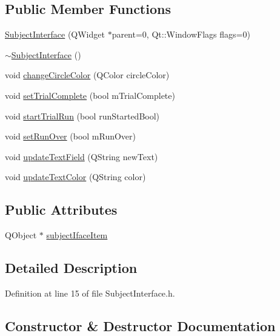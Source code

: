 \subsection*{Public Member Functions}
\begin{DoxyCompactItemize}
\item 
\hyperlink{class_subject_interface_aad1ec3eaf1a7a559e934631617f53ed2}{Subject\+Interface} (Q\+Widget $\ast$parent=0, Qt\+::\+Window\+Flags flags=0)
\item 
\hyperlink{class_subject_interface_ae3a3243c92e7e1f4ecc52d5a19b71f47}{$\sim$\+Subject\+Interface} ()
\item 
void \hyperlink{class_subject_interface_acb1d412923811d0f01aa8979c4393d7e}{change\+Circle\+Color} (Q\+Color circle\+Color)
\item 
void \hyperlink{class_subject_interface_a8745c1479558aba371ce0b984337c588}{set\+Trial\+Complete} (bool m\+Trial\+Complete)
\item 
void \hyperlink{class_subject_interface_aab83bd19dd636c8902a3e04aa8851cd2}{start\+Trial\+Run} (bool run\+Started\+Bool)
\item 
void \hyperlink{class_subject_interface_ae3758be4462ddf57f8f97acfc1d17538}{set\+Run\+Over} (bool m\+Run\+Over)
\item 
void \hyperlink{class_subject_interface_ab843d4b0a55c2a0126f4406db1e93069}{update\+Text\+Field} (Q\+String new\+Text)
\item 
void \hyperlink{class_subject_interface_ac02d6d105e271c6ebed5917c68942a2c}{update\+Text\+Color} (Q\+String color)
\end{DoxyCompactItemize}
\subsection*{Public Attributes}
\begin{DoxyCompactItemize}
\item 
Q\+Object $\ast$ \hyperlink{class_subject_interface_afa214a1816549b7cbcdd28023cd0b308}{subject\+Iface\+Item}
\end{DoxyCompactItemize}


\subsection{Detailed Description}


Definition at line 15 of file Subject\+Interface.\+h.



\subsection{Constructor \& Destructor Documentation}
\mbox{\label{class_subject_interface_aad1ec3eaf1a7a559e934631617f53ed2}} 
